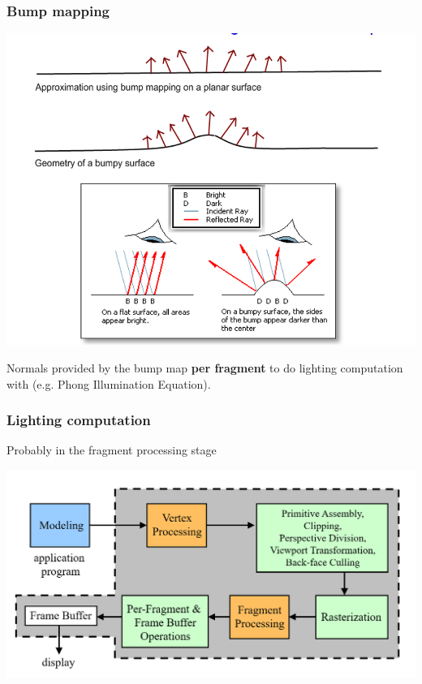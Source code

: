 \documentclass{beamer}
\begin{document}
\begin{frame}
    \frametitle{Bump mapping}

    \begin{center}
        \includegraphics[scale=0.4]{bump-normals.png}
    \end{center}

    Normals provided by the bump map \textbf{per fragment} to do lighting computation with
    (e.g. Phong Illumination Equation).

\end{frame}

\begin{frame}
    \frametitle{Lighting computation}

    Probably in the fragment processing stage

    \begin{center}
        \includegraphics[scale=0.5]{pipeline.png}
    \end{center}

\end{frame}
\end{document}
